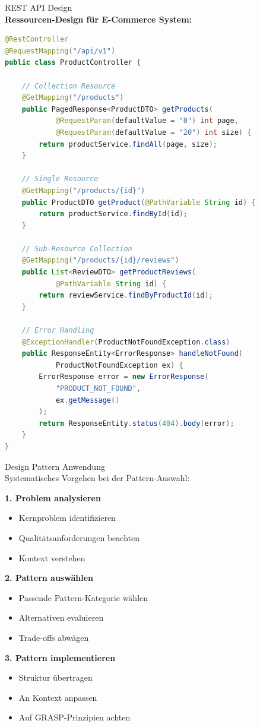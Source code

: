 \begin{example2}{REST API Design}\\
\textbf{Ressourcen-Design für E-Commerce System:}

\begin{lstlisting}[language=Java, style=basesmol]
@RestController
@RequestMapping("/api/v1")
public class ProductController {
    
    // Collection Resource
    @GetMapping("/products")
    public PagedResponse<ProductDTO> getProducts(
            @RequestParam(defaultValue = "0") int page,
            @RequestParam(defaultValue = "20") int size) {
        return productService.findAll(page, size);
    }
    
    // Single Resource
    @GetMapping("/products/{id}")
    public ProductDTO getProduct(@PathVariable String id) {
        return productService.findById(id);
    }
    
    // Sub-Resource Collection
    @GetMapping("/products/{id}/reviews")
    public List<ReviewDTO> getProductReviews(
            @PathVariable String id) {
        return reviewService.findByProductId(id);
    }
    
    // Error Handling
    @ExceptionHandler(ProductNotFoundException.class)
    public ResponseEntity<ErrorResponse> handleNotFound(
            ProductNotFoundException ex) {
        ErrorResponse error = new ErrorResponse(
            "PRODUCT_NOT_FOUND",
            ex.getMessage()
        );
        return ResponseEntity.status(404).body(error);
    }
}
\end{lstlisting}
\end{example2}

\begin{KR}{Design Pattern Anwendung}\\
Systematisches Vorgehen bei der Pattern-Auswahl:

\textbf{1. Problem analysieren}
\begin{itemize}
    \item Kernproblem identifizieren
    \item Qualitätsanforderungen beachten
    \item Kontext verstehen
\end{itemize}

\textbf{2. Pattern auswählen}
\begin{itemize}
    \item Passende Pattern-Kategorie wählen
    \item Alternativen evaluieren
    \item Trade-offs abwägen
\end{itemize}

\textbf{3. Pattern implementieren}
\begin{itemize}
    \item Struktur übertragen
    \item An Kontext anpassen
    \item Auf GRASP-Prinzipien achten
\end{itemize}
\end{KR}

